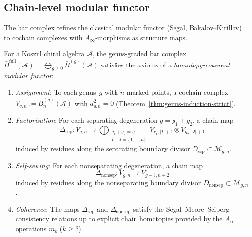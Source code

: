 \subsection{Chain-level modular functor}\label{subsec:chain-modular-functor}

The bar complex refines the classical modular functor (Segal, Bakalov--Kirillov) to cochain complexes with $A_\infty$-morphisms as structure maps.

\begin{theorem}\label{thm:chain-modular-functor}
For a Koszul chiral algebra $\mathcal{A}$, the genus-graded bar complex
$\bar{B}^{\mathrm{full}}(\mathcal{A}) = \bigoplus_{g \geq 0}
\bar{B}^{(g)}(\mathcal{A})$ satisfies the axioms of a
\emph{homotopy-coherent modular functor}:
\begin{enumerate}[label=\textup{(\roman*)}]
\item \emph{Assignment}: To each genus~$g$ with $n$ marked points,
  a cochain complex $V_{g,n} := \bar{B}^{(g)}_n(\mathcal{A})$
  with $d_{g,n}^2 = 0$
  \textup{(}Theorem~\textup{\ref{thm:genus-induction-strict})}.
\item \emph{Factorization}: For each separating degeneration
  $g = g_1 + g_2$, a chain map
  \begin{equation}\label{eq:factorization-map}
  \Delta_{\mathrm{sep}}: V_{g,n} \to
  \bigoplus_{\substack{g_1+g_2=g \\ I \sqcup J = \{1,\ldots,n\}}}
  V_{g_1,|I|+1} \otimes V_{g_2,|J|+1}
  \end{equation}
  induced by residues along the separating boundary divisor
  $D_{\mathrm{sep}} \subset \overline{\mathcal{M}}_{g,n}$.
\item \emph{Self-sewing}: For each nonseparating degeneration, a chain map
  \begin{equation}\label{eq:self-sewing-map}
  \Delta_{\mathrm{nonsep}}: V_{g,n} \to V_{g-1,n+2}
  \end{equation}
  induced by residues along the nonseparating boundary divisor
  $D_{\mathrm{nonsep}} \subset \overline{\mathcal{M}}_{g,n}$.
\item \emph{Coherence}: The maps $\Delta_{\mathrm{sep}}$ and
  $\Delta_{\mathrm{nonsep}}$ satisfy the Segal--Moore--Seiberg
  consistency relations up to explicit chain homotopies
  provided by the $A_\infty$ operations $m_k$ ($k \geq 3$).
\end{enumerate}
\end{theorem}

